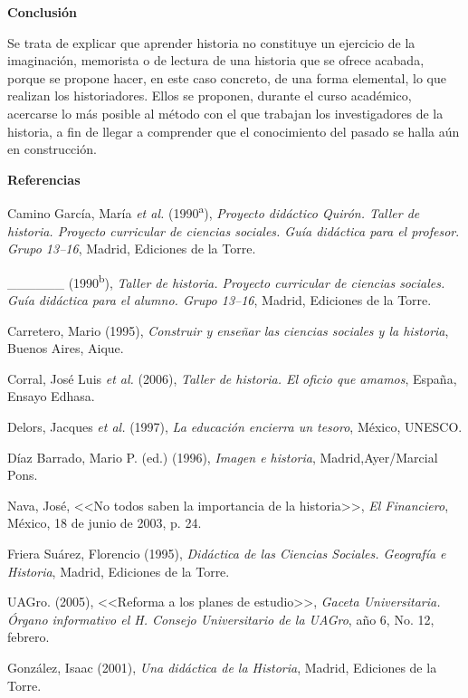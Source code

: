 \bigskip
\textbf{Conclusión}

Se trata de explicar que aprender historia no constituye un ejercicio de la
imaginación, memorista o de lectura de una historia que se ofrece acabada,
porque se propone hacer, en este caso concreto, de una forma elemental, lo que
realizan los historiadores. Ellos se proponen, durante el curso académico,
acercarse lo más posible al método con el que trabajan los investigadores de la
historia, a fin de llegar a comprender que el conocimiento del pasado se halla aún
en construcción.

\bigskip 
\textbf{Referencias}
\enlargethispage{1\baselineskip}

\medskip
Camino García, María {\itshape et al\@.} (1990\textsuperscript{a}), 
\textit{Proyecto didáctico Quirón. Taller de 
historia. Proyecto curricular de ciencias sociales. Guía didáctica para 
el profesor}. \textit{Grupo 13--16}, Madrid, Ediciones de la Torre. 
 
\_\_\_\_\_\_ (1990\textsuperscript{b}),
\textit{Taller de historia. Proyecto curricular de ciencias sociales. 
Guía didáctica para el alumno. Grupo 13--16}, Madrid, Ediciones de la 
Torre.

Carretero, Mario (1995), \textit{Construir y 
enseñar las ciencias sociales y la historia}, Buenos Aires, Aique. 

Corral, José Luis {\itshape et al\@.} (2006), \textit{Taller de historia. El oficio que amamos}, España, Ensayo Edhasa.

Delors, Jacques {\itshape et al\@.} (1997), \textit{La educación encierra un tesoro}, México, UNESCO\@.

\begin{sloppypar}
Díaz Barrado, Mario P. (ed.) (1996), 
\textit{Imagen e historia}, Madrid,\linebreak Ayer\slash{}Marcial Pons.
\end{sloppypar}
 
Nava, José, <<No todos saben la importancia de la historia>>, \textit{El Financiero}, México, 18 de junio de 2003, p. 24.

Friera Suárez, Florencio (1995), \textit{Didáctica de las Ciencias 
Sociales. Geografía e Historia}, Madrid, Ediciones de la Torre.
 
UAGro. (2005), <<Reforma a los planes de estudio>>, \textit{Gaceta 
Universitaria. Órgano informativo el H. Consejo Universitario de la 
UAGro}, año 6, No. 12, febrero.

González, Isaac (2001), \textit{Una didáctica de la Historia}, Madrid, Ediciones de la Torre.

